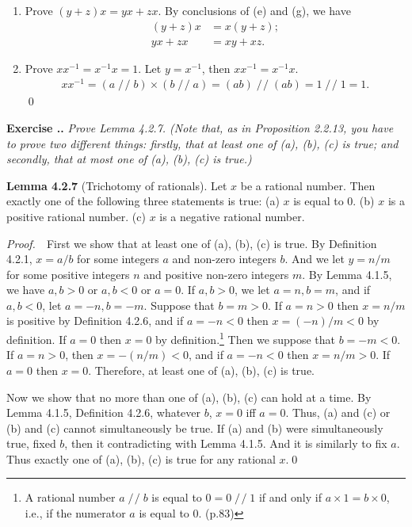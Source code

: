 \documentclass{book}
\DeclareMathOperator{\tby}{/\!/}%
\newcommand{\pff}{\vspace{.25em}\noindent\emph{Proof.}~~}
\newcommand{\titl}[1]{\noindent\textbf{#1}}
\newcounter{Exercise}[section]
\renewcommand{\theExercise}{\thesection.\arabic{Exercise}.}
\newcommand{\new}{\vspace{1.5em}\noindent\textbf{{Exercise \stepcounter{Exercise}\textbf{\theExercise}}} }
\begin{document}
\begin{enumerate}
    \item Prove $(y+z)x=yx+zx$. By conclusions of (e) and (g), we have
    \begin{align*}
        (y+z)x&=x(y+z);\\
        yx+zx&=xy+xz.
    \end{align*}

    \item Prove $xx^{-1}=x^{-1}x=1$. Let $y=x^{-1}$, then $xx^{-1}=x^{-1}x$.
    \begin{align*}
       xx^{-1}=(a\tby b)\times(b\tby a)=(ab)\tby(ab)=1\tby1=1.
    \end{align*}\qed
\end{enumerate}

\new\emph{Prove Lemma 4.2.7. (Note that, as in Proposition 2.2.13, you have to prove two different things: firstly, that at least one of (a), (b), (c) is true; and secondly, that at most one of (a), (b), (c) is true.)}

\begin{framed}
\titl{Lemma 4.2.7} (Trichotomy of rationals). Let $x$ be a rational number. Then exactly one of the following three statements is true: (a) $x$ is equal to $0$. (b) $x$ is a positive rational number. (c) $x$ is a negative rational number.
\end{framed}

\pff First we show that at least one of (a), (b), (c) is true. By Definition 4.2.1, $x=a/b$ for some integers $a$ and non-zero integers $b$. And we let $y=n/m$ for some positive integers $n$ and positive non-zero integers $m$. By Lemma 4.1.5, we have $a,b>0$ or $a,b<0$ or $a=0$. If $a,b>0$, we let $a=n,b=m$, and if $a,b<0$, let $a=-n,b=-m$. Suppose that $b=m>0$. If $a=n>0$ then $x=n/m$ is positive by Definition 4.2.6, and if $a=-n<0$ then $x=(-n)/m<0$ by definition. If $a=0$ then $x=0$ by definition.\footnote{A rational number $a\tby b$ is equal to $0=0\tby1$ if and only if $a\times 1=b\times 0$, i.e., if the numerator $a$ is equal to $0$. (p.83)} Then we suppose that $b=-m<0$. If $a=n>0$, then $x=-(n/m)<0$, and if $a=-n<0$ then $x=n/m>0$. If $a=0$ then $x=0$. Therefore, at least one of (a), (b), (c) is true.

Now we show that no more than one of (a), (b), (c) can hold at a time. By Lemma 4.1.5, Definition 4.2.6, whatever $b$, $x=0$ iff $a=0$. Thus, (a) and (c) or (b) and (c) cannot simultaneously be true. If (a) and (b) were simultaneously true, fixed $b$, then it contradicting with Lemma 4.1.5. And it is similarly to fix $a$. Thus exactly one of (a), (b), (c) is true for any rational $x$.\qed
\end{document}
